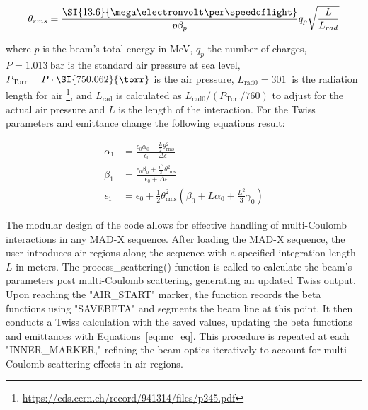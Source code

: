 \documentclass[a4paper,
               biblatex,     %
               ]{jacow}
\begin{document}
\[
\theta_{rms} = \frac{\SI{13.6}{\mega\electronvolt\per\speedoflight}}{p\beta_{p}}q_{p}\sqrt\frac{L}{L_{rad}}\]

where $p$ is the beam's total energy in MeV, $q_{p}$ the number of charges, $P=\SI{1.013}{\bar}$ is the standard air pressure at sea level, $P_{\text{Torr}}=P\cdot\SI{750.062}{\torr}$ is the air pressure, $L_{\text{rad0}}=\SI{301}{}$ is the radiation length for air \footnote{\href{https://cds.cern.ch/record/941314/files/p245.pdf}{{https://cds.cern.ch/record/941314/files/p245.pdf}}}, and $L_{\text{rad}}$ is calculated as $L_{\text{rad0}}/(P_{\text{Torr}}/760)$ to adjust for the actual air pressure and $L$ is the length of the interaction. For the Twiss parameters and emittance change the following equations result:


\begin{equation}
\label{eq:mc_eq}
\begin{aligned}
\alpha_{1} &= \frac{\epsilon_0 \alpha_0 - \frac{L}{2} \theta_{\text{rms}}^2}{\epsilon_0 + \Delta \epsilon}\\
\beta_{1} &= \frac{\epsilon_0 \beta_0 + \frac{L^2}{3} \theta_{\text{rms}}^2}{\epsilon_0 + \Delta \epsilon}\\
\epsilon_{1} &= \epsilon_0 + \frac{1}{2} \theta_{\text{rms}}^2 \left( \beta_0 + L \alpha_0 + \frac{L^2}{3} \gamma_0 \right)
\end{aligned}
\end{equation}

The modular design of the code allows for effective handling of multi-Coulomb interactions in any MAD-X sequence. After loading the MAD-X sequence, the user introduces air regions along the sequence with a specified integration length $L$ in meters. The process\_scattering() function is called to calculate the beam's parameters post multi-Coulomb scattering, generating an updated Twiss output. Upon reaching the "AIR\_START" marker, the function records the beta functions using "SAVEBETA" and segments the beam line at this point. It then conducts a Twiss calculation with the saved values, updating the beta functions and emittances with Equations~\ref{eq:mc_eq}. This procedure is repeated at each "INNER\_MARKER," refining the beam optics iteratively to account for multi-Coulomb scattering effects in air regions.
\end{document}
